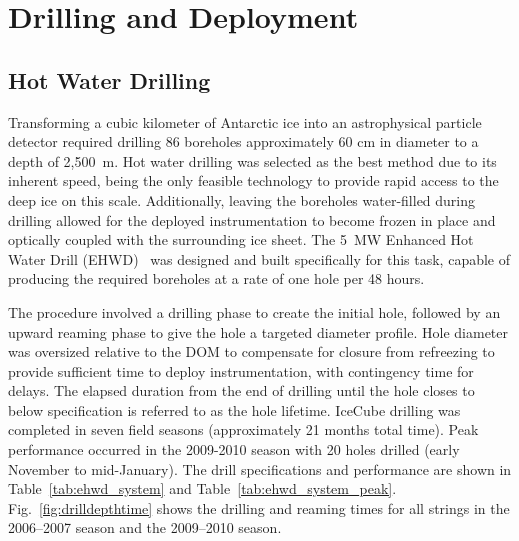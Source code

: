 
\section{\label{sec:drill-deploy}Drilling and Deployment}

\subsection{\label{sec:hot_water_drilling}Hot Water Drilling}

Transforming a cubic kilometer of Antarctic ice into an astrophysical
particle detector required drilling 86 boreholes
approximately 60 cm in diameter to a depth of 2,500~m. Hot water drilling
was selected as the best method due to its inherent speed, being the only
feasible technology to provide rapid access to the deep ice on this scale.
Additionally, leaving the boreholes water-filled during drilling allowed
for the deployed instrumentation to become frozen in place and optically
coupled with the surrounding ice sheet. The 5~MW Enhanced Hot Water Drill
(EHWD)~\cite{ehwd} was designed and built specifically for this task,
capable of producing the required boreholes at a rate of one hole per 48
hours.

The procedure involved a drilling phase to create the initial hole,
followed by an upward reaming phase to give the 
hole a targeted diameter profile.  Hole diameter was oversized relative to
the DOM to compensate for closure from refreezing to provide sufficient
time to deploy instrumentation, with contingency time for delays.  The
elapsed duration from the end of drilling until the hole closes to below
specification is referred to as the hole lifetime. IceCube drilling was
completed in seven field seasons (approximately 21 months total time).
Peak performance occurred in the 2009-2010 season with 20 holes drilled
(early November to mid-January).  The drill specifications and performance
are shown in Table~\ref{tab:ehwd_system} and
Table~\ref{tab:ehwd_system_peak}. Fig.~\ref{fig:drilldepthtime} shows the
drilling and reaming times for all strings in the 2006--2007 season and the
2009--2010 season.

\vspace{\baselineskip}

